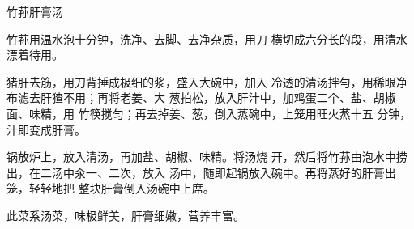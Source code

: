 \begin{recipe}{竹荪肝膏汤}

\ingredients


\cooking

\step 	竹荪用温水泡十分钟，洗净、去脚、去净杂质，用刀 横切成六分长的段，用清水漂着待用。

\step 	猪肝去筋，用刀背捶成极细的浆，盛入大碗中，加入 冷透的清汤拌勻，用稀眼净布滤去肝猹不用；再将老姜、大 葱拍松，放入肝汁中，加鸡蛋二个、盐、胡椒面、味精，用 竹筷搅匀；再去掉姜、葱，倒入蒸碗中，上笼用旺火蒸十五 分钟，汁即变成肝膏。

\step 	锅放炉上，放入清汤，再加盐、胡椒、味精。将汤烧 开，然后将竹荪由泡水中捞出，在二汤中汆一、二次，放入 汤中，随即起锅放入碗中。再将蒸好的肝膏出笼，轻轻地把 整块肝膏倒入汤碗中上席。

\notes

此菜系汤菜，味极鲜美，肝膏细嫩，营养丰富。

\end{recipe}

